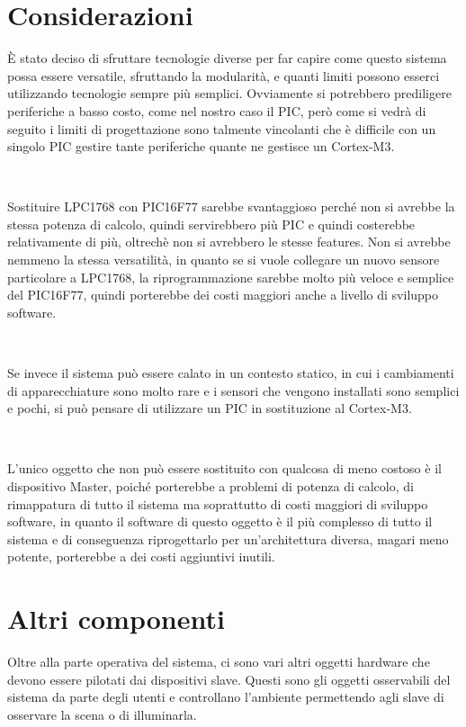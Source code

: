 \documentclass[a4paper,titlepage]{book}
\begin{document}
\newpage
\section{Considerazioni}

È stato deciso di sfruttare tecnologie diverse per far capire come questo sistema possa essere versatile, sfruttando la modularità, e quanti limiti possono esserci utilizzando tecnologie sempre più semplici. Ovviamente si potrebbero prediligere periferiche a basso costo, come nel nostro caso il PIC, però come si vedrà di seguito i limiti di progettazione sono talmente vincolanti che è difficile con un singolo PIC gestire tante periferiche quante ne gestisce un Cortex-M3.

~

Sostituire LPC1768 con PIC16F77 sarebbe svantaggioso perché non si avrebbe la stessa potenza di calcolo, quindi servirebbero più PIC e quindi costerebbe relativamente di più, oltrechè non si avrebbero le stesse features. Non si avrebbe nemmeno la stessa versatilità, in quanto se si vuole collegare un nuovo sensore particolare a LPC1768, la riprogrammazione sarebbe molto più veloce e semplice del PIC16F77, quindi porterebbe dei costi maggiori anche a livello di sviluppo software.

~

Se invece il sistema può essere calato in un contesto statico, in cui i cambiamenti di apparecchiature sono molto rare e i sensori che vengono installati sono semplici e pochi, si può pensare di utilizzare un PIC in sostituzione al Cortex-M3.

~

L'unico oggetto che non può essere sostituito con qualcosa di meno costoso è il dispositivo Master, poiché porterebbe a problemi di potenza di calcolo, di rimappatura di tutto il sistema ma soprattutto di costi maggiori di sviluppo software, in quanto il software di questo oggetto è il più complesso di tutto il sistema e di conseguenza riprogettarlo per un'architettura diversa, magari meno potente, porterebbe a dei costi aggiuntivi inutili. 



\section{Altri componenti}

Oltre alla parte operativa del sistema, ci sono vari altri oggetti hardware che devono essere pilotati dai dispositivi slave. Questi sono gli oggetti osservabili del sistema da parte degli utenti e controllano l'ambiente permettendo agli slave di osservare la scena o di illuminarla.
\end{document}
